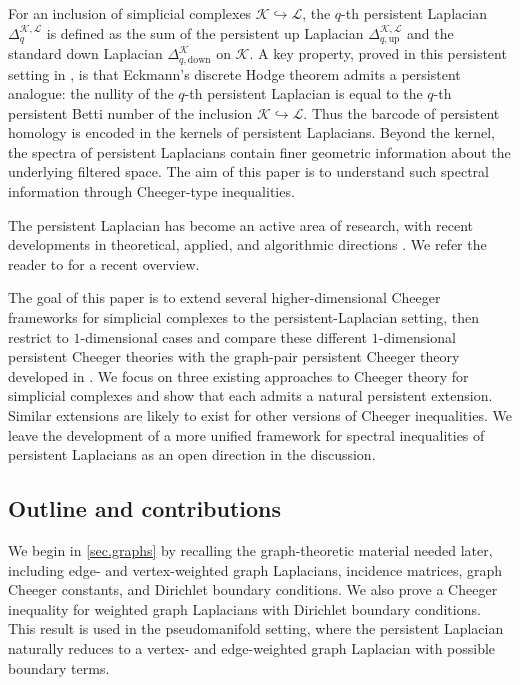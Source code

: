 \documentclass{article}
\newcommand{\KK}{\mathcal{K}}
\newcommand{\LL}{\mathcal{L}}
\begin{document}
For an inclusion of simplicial complexes \(\KK\hookrightarrow \LL\), the \(q\)-th persistent Laplacian \(\Delta_q^{\KK,\LL}\) is defined as the sum of the persistent up Laplacian \(\Delta_{q,\mathrm{up}}^{\KK,\LL}\) and the standard down Laplacian \(\Delta_{q,\mathrm{down}}^\KK\) on \(\KK\).
A
 key property, 
 proved in this persistent setting in \cite[Theorem 2.7]{pers_lap},
 is that Eckmann’s discrete Hodge theorem admits a persistent analogue: the nullity of the $q$-th persistent Laplacian is equal to the $q$-th persistent Betti number of the inclusion $\KK\hookrightarrow \LL$.
Thus the barcode of persistent homology is encoded in the kernels of persistent Laplacians. Beyond the kernel, the spectra of persistent Laplacians contain finer geometric information about the underlying filtered space. The aim of this paper is to understand such spectral information through Cheeger-type inequalities.

The persistent Laplacian has become an active area of research, with recent developments in theoretical, applied, and algorithmic directions \cite{davies23c,wolf2025generalized,MR5053447,jones2025petls}. We refer the reader to \cite{wei2023} for a recent overview.

The goal of this paper is to extend several higher-dimensional Cheeger frameworks for simplicial complexes to the persistent-Laplacian setting, 
then restrict to $1$-dimensional cases and compare these different $1$-dimensional persistent Cheeger theories with 
the graph-pair persistent Cheeger theory developed in \cite{pers_lap}.
We focus on three existing approaches to Cheeger theory for simplicial complexes \cite{jost2024cheeger,MR3516884,MR3194207} and show that each admits a natural persistent extension. Similar extensions are likely to exist for other versions of Cheeger inequalities. We leave the development of a more unified framework for spectral inequalities of persistent Laplacians as an open direction in the discussion.

\subsection{Outline and contributions}
\label{subsec:overview_contributions}

We begin in \cref{sec.graphs} by recalling the graph-theoretic material needed later, including edge- and vertex-weighted graph Laplacians, incidence matrices, graph Cheeger constants, and Dirichlet boundary conditions. We also prove a Cheeger inequality for weighted graph Laplacians with Dirichlet boundary conditions. This result is used in the pseudomanifold setting, where the persistent Laplacian naturally reduces to a vertex- and edge-weighted graph Laplacian with possible boundary terms.
\end{document}
